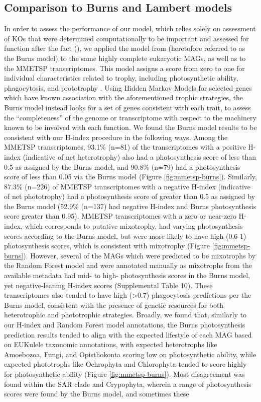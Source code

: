 \documentclass[12pt]{article}
\numberwithin{equation}{section}
\begin{document}
\subsection{Comparison to Burns and Lambert models}\label{burnssec}
In order to assess the performance of our model, which relies solely on assessment of KOs \citep{Kanehisa_2019} that were determined computationally to be important and assessed for function after the fact (), we applied the model from \cite{burns2018gene} (heretofore referred to as the Burns model) to the same highly complete eukaryotic MAGs, as well as to the MMETSP transcriptomes. This model assigns a score from zero to one for individual characteristics related to trophy, including photosynthetic ability, phagocytosis, and prototrophy \citep{burns2018gene}. Using Hidden Markov Models for selected genes which have known association with the aforementioned trophic strategies, the Burns model instead looks for a set of genes consistent with each trait, to assess the ``completeness'' of the genome or transcriptome with respect to the machinery known to be involved with each function. We found the Burns model results to be consistent with our H-index procedure in the following ways. Among the MMETSP transcriptomes, 93.1\% (n=81) of the transcriptomes with a positive H-index (indicative of net heterotrophy) also had a photosynthesis score of less than 0.5 as assigned by the Burns model, and 90.8\% (n=79) had a photosynthesis score of less than 0.05 via the Burns model (Figure \ref{fig:mmetsp-burns}). Similarly, 87.3\% (n=226)  of MMETSP transcriptomes with a negative H-index (indicative of net phototrophy) had a photosynthesis score of greater than 0.5 as assigned by the Burns model (52.9\% (n=137) had negative H-index and Burns photosynthesis score greater than 0.95). MMETSP transcriptomes with a zero or near-zero H-index, which corresponds to putative mixotrophy, had varying photosynthesis scores according to the Burns model, but were more likely to have high (0.6-1) photosynthesis scores, which is consistent with mixotrophy (Figure \ref{fig:mmetsp-burns}). However, several of the MAGs which were predicted to be mixotrophs by the Random Forest model and were annotated manually as mixotrophs from the available metadata had mid- to high- photosynthesis scores in the Burns model, yet negative-leaning H-index scores (Supplemental Table 10). These transcriptomes also tended to have high (>0.7) phagocytosis predictions per the Burns model, consistent with the presence of genetic resources for both heterotrophic and phototrophic strategies. Broadly, we found that, similarly to our H-index and Random Forest model annotations, the Burns photosynthesis prediction results tended to align with the expected lifestyle of each MAG based on EUKulele \citep{Krinos2021EUKulele} taxonomic annotations, with expected heterotrophs like Amoebozoa, Fungi, and Opisthokonta scoring low on photosynthetic ability, while expected phototrophs like Ochrophyta and Chlorophyta tended to score highly for photosynthetic ability (Figure \ref{fig:mmetsp-burns}). Most disagreement was found within the SAR clade and Crypophyta, wherein a range of photosynthesis scores were found by the Burns model, and sometimes these 
\end{document}
